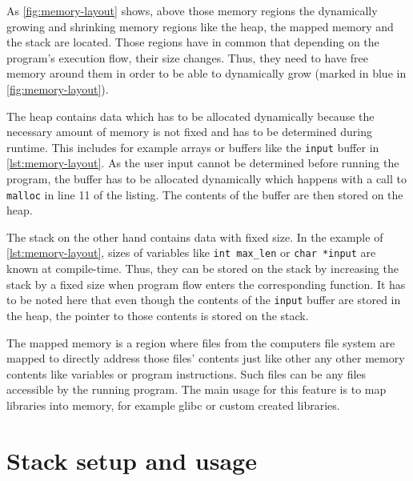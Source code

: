 As \cref{fig:memory-layout} shows, above those memory regions the dynamically growing and shrinking memory regions like the heap, the mapped memory and the stack are located.
Those regions have in common that depending on the program's execution flow, their size changes.
Thus, they need to have free memory around them in order to be able to dynamically grow (marked in blue in \cref{fig:memory-layout}).

The heap contains data which has to be allocated dynamically because the necessary amount of memory is not fixed and has to be determined during runtime.
This includes for example arrays or buffers like the \texttt{input} buffer in \cref{lst:memory-layout}.
As the user input cannot be determined before running the program, the buffer has to be allocated dynamically which happens with a call to \texttt{malloc} in line 11 of the listing.
The contents of the buffer are then stored on the heap.

The stack on the other hand contains data with fixed size.
In the example of \cref{lst:memory-layout}, sizes of variables like \texttt{int max\_len} or \texttt{char *input} are known at compile-time.
Thus, they can be stored on the stack by increasing the stack by a fixed size when program flow enters the corresponding function.
It has to be noted here that even though the contents of the \texttt{input} buffer are stored in the heap, the pointer to those contents is stored on the stack.

The mapped memory is a region where files from the computers file system are mapped to directly address those files' contents just like other any other memory contents like variables or program instructions.
Such files can be any files accessible by the running program.
The main usage for this feature is to map libraries into memory, for example \gls{glibc} or custom created libraries.



\section{Stack setup and usage}
\label{sec:stack-setup-and-usage}

